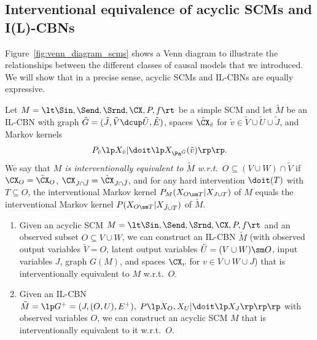 \subsection{Interventional equivalence of acyclic SCMs and I(L)-CBNs}

Figure~\ref{fig:venn_diagram_scms} shows a Venn diagram to illustrate the relationships between the different
classes of causal models that we introduced.
We will show that in a precise sense, acyclic SCMs and IL-CBNs are equally expressive.
\begin{Def}
  Let $M = \lt \Sin, \Send, \Srnd, \CX, P, f \rt$ be a simple SCM and let $\tilde{M}$ be an IL-CBN with graph
  $\tilde{G} = (\tilde{J},\tilde{V}\dcup\tilde{U},\tilde{E})$, spaces $\tilde{\CX}_{\tilde v}$ for $\tilde{v} \in \tilde{V} \cup \tilde{U} \cup \tilde{J}$,
  and Markov kernels $$P_{\tilde{v}}\lp X_{\tilde{v}} | \doit \lp X_{\Pa^{\tilde{G}}}(\tilde{v}) \rp\rp.$$
  We say that \emph{$M$ is interventionally equivalent to $\tilde{M}$ w.r.t.\ $O \subseteq (V \cup W) \cap \tilde{V}$} if
  $\CX_O = \tilde{\CX}_O$, $\CX_{J \cap \tilde{J}} = \tilde{\CX}_{J \cap \tilde{J}}$, and
  for any hard intervention $\doit(T)$ with $T \subseteq O$, the interventional Markov kernel $P_M(X_{O\sm T}|X_{J\cup T})$ of $M$ equals the interventional Markov kernel $P(X_{O\sm T}|X_{\tilde{J}\cup T})$ of $\tilde{M}$.
\end{Def}
\begin{Prp}
  \begin{enumerate}
    \item Given an acyclic SCM $M = \lt \Sin, \Send, \Srnd, \CX, P, f \rt$ and an observed subset $O \subseteq V \cup W$, we can construct an IL-CBN $\tilde{M}$ (with observed output variables $\tilde{V} = O$, latent output variables $\tilde{U} = (V \cup W) \sm O$, input variables $J$, graph $G(M)$, and spaces $\CX_v$ for $v \in V\cup W \cup J$) that is interventionally equivalent to $M$ w.r.t.\ $O$.
    \item Given an IL-CBN 
      $\tilde{M} = \lp G^+=(J,(O,U),E^+), \; P\lp X_O,X_U| \doit\lp X_J \rp\rp \rp$
      with observed variables $O$, we can construct an acyclic SCM $M$ that is interventionally equivalent to it w.r.t.\ $O$.
  \end{enumerate}
\end{Prp}
